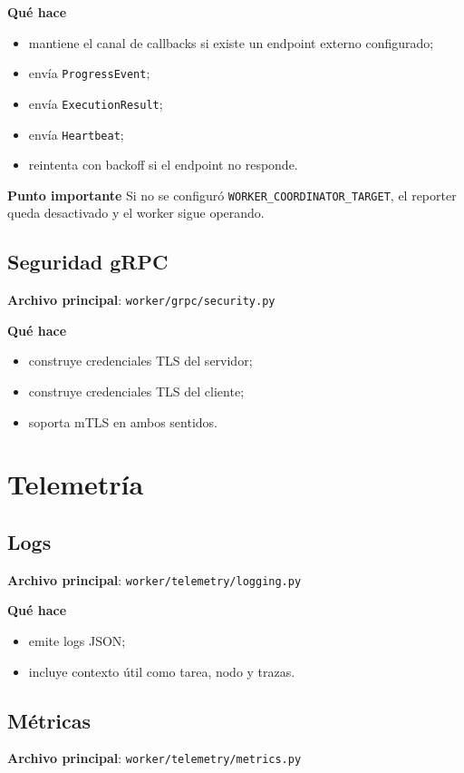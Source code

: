 \documentclass[11pt]{article}
\begin{document}
\textbf{Qué hace}
\begin{itemize}
\item mantiene el canal de callbacks si existe un endpoint externo configurado;
\item envía \texttt{ProgressEvent};
\item envía \texttt{ExecutionResult};
\item envía \texttt{Heartbeat};
\item reintenta con backoff si el endpoint no responde.
\end{itemize}

\textbf{Punto importante}
Si no se configuró \texttt{WORKER\_COORDINATOR\_TARGET}, el reporter queda desactivado y el worker sigue operando.

\subsection{Seguridad gRPC}
\textbf{Archivo principal}: \texttt{worker/grpc/security.py}

\textbf{Qué hace}
\begin{itemize}
\item construye credenciales TLS del servidor;
\item construye credenciales TLS del cliente;
\item soporta mTLS en ambos sentidos.
\end{itemize}

\section{Telemetría}

\subsection{Logs}
\textbf{Archivo principal}: \texttt{worker/telemetry/logging.py}

\textbf{Qué hace}
\begin{itemize}
\item emite logs JSON;
\item incluye contexto útil como tarea, nodo y trazas.
\end{itemize}

\subsection{Métricas}
\textbf{Archivo principal}: \texttt{worker/telemetry/metrics.py}
\end{document}
